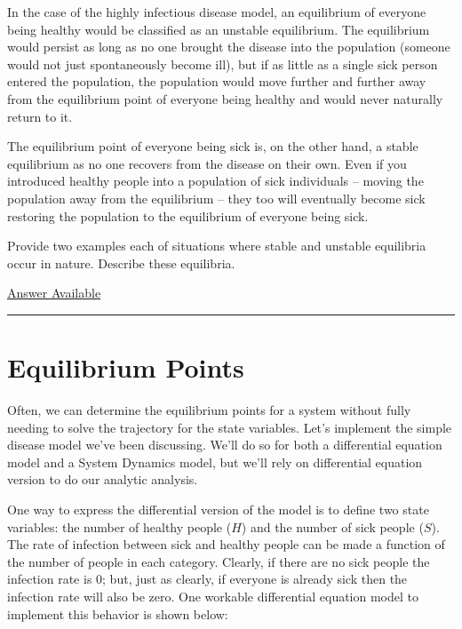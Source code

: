 \documentclass[]{memoir}
\begin{document}
In the case of the highly infectious disease model, an equilibrium of
everyone being healthy would be classified as an unstable equilibrium.
The equilibrium would persist as long as no one brought the disease into
the population (someone would not just spontaneously become ill), but if
as little as a single sick person entered the population, the population
would move further and further away from the equilibrium point of
everyone being healthy and would never naturally return to it.

The equilibrium point of everyone being sick is, on the other hand, a
stable equilibrium as no one recovers from the disease on their own.
Even if you introduced healthy people into a population of sick
individuals -- moving the population away from the equilibrium -- they
too will eventually become sick restoring the population to the
equilibrium of everyone being sick.


Provide two examples each of situations where stable and unstable
equilibria occur in nature. Describe these equilibria.

\hyperref[Ans-11-1]{Answer Available}

\begin{center}\rule{3in}{0.4pt}\end{center}

\section{Equilibrium Points}

Often, we can determine the equilibrium points for a system without
fully needing to solve the trajectory for the state variables. Let's
implement the simple disease model we've been discussing. We'll do so
for both a differential equation model and a System Dynamics model, but
we'll rely on differential equation version to do our analytic analysis.

One way to express the differential version of the model is to define
two state variables: the number of healthy people ($H$) and the number
of sick people ($S$). The rate of infection between sick and healthy
people can be made a function of the number of people in each category.
Clearly, if there are no sick people the infection rate is 0; but, just
as clearly, if everyone is already sick then the infection rate will
also be zero. One workable differential equation model to implement this
behavior is shown below:
\end{document}
